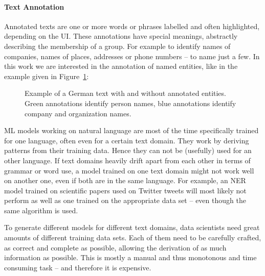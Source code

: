 
	\paragraph{Text Annotation} Annotated texts are one or more words or phrases labelled and often highlighted, depending on the \ac{UI}. These annotations have special meanings, abstractly describing the membership of a group. For example to identify names of companies, names of places, addresses or phone numbers -- to name just a few. In this work we are interested in the annotation of named entities, like in the example given in Figure~\ref{fig:exampleAnnotation}:

	\begin{figure}[h]
		\centering
		\qquad
		\caption{Example of a German text with and without annotated entities. Green annotations identify person names, blue annotations identify company and organization names.}%
		\label{fig:exampleAnnotation}%
	\end{figure}

	\ac{ML} models working on natural language are most of the time specifically trained for one language, often even for a certain text domain. They work by deriving patterns from their training data. Hence they can not be (usefully) used for an other language. If text domains heavily drift apart from each other in terms of grammar or word use, a model trained on one text domain might not work well on another one, even if both are in the same language. For example, an \ac{NER} model trained on scientific papers used on Twitter tweets will most likely not perform as well as one trained on the appropriate data set -- even though the same algorithm is used.

	To generate different models for different text domains, data scientists need great amounts of different training data sets. Each of them need to be carefully crafted, as correct and complete as possible, allowing the derivation of as much information as possible. This is mostly a manual and thus monotonous and time consuming task -- and therefore it is expensive.
